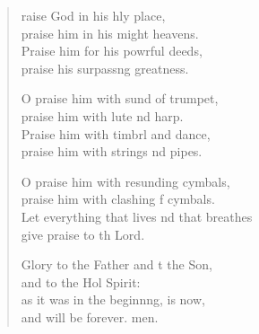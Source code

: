 \settowidth{\versewidth}{Let everything that lives and that breathes *}
\begin{verse}%
  \begin{patverse}
raise God in his hly place,\Med\\
praise him in his might heavens.\\
Praise him for his powrful deeds,\Med\\
praise his surpass\pointup{\i}ng greatness.

O praise him with sund of trumpet,\Med\\
praise him with lute nd harp.\\
Praise him with timbrl and dance,\Med\\
praise him with strings nd pipes.

O praise him with resunding cymbals,\Med\\
praise him with clashing f cymbals.\\
Let everything that lives nd that breathes\Med\\
give praise to th Lord.

Glory to the Father and t the Son,\Med\\
and to the Hol Spirit:\\
as it was in the beginn\pointup{\i}ng, is now,\Med\\
and will be forever. men. 
  \end{patverse}
\end{verse}
